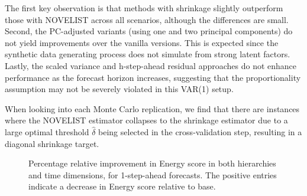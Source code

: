 \documentclass[
  11pt,
  letterpaper,
  DIV=11,
  numbers=noendperiod,
  titlepage]{scrartcl}
\begin{document}
The first key observation is that methods with shrinkage slightly
outperform those with NOVELIST across all scenarios, although the
differences are small. Second, the PC-adjusted variants (using one and
two principal components) do not yield improvements over the vanilla
versions. This is expected since the synthetic data generating process
does not simulate from strong latent factors. Lastly, the scaled
variance and h-step-ahead residual approaches do not enhance performance
as the forecast horizon increases, suggesting that the proportionality
assumption may not be severely violated in this VAR(1) setup.

When looking into each Monte Carlo replication, we find that there are
instances where the NOVELIST estimator collapses to the shrinkage
estimator due to a large optimal threshold \(\hat{\delta}\) being
selected in the cross-validation step, resulting in a diagonal shrinkage
target.

\begin{figure}


\caption{\label{fig-sim-results-2}Percentage relative improvement in
Energy score in both hierarchies and time dimensions, for 1-step-ahead
forecasts. The positive entries indicate a decrease in Energy score
relative to base.}

\end{figure}%
\end{document}
